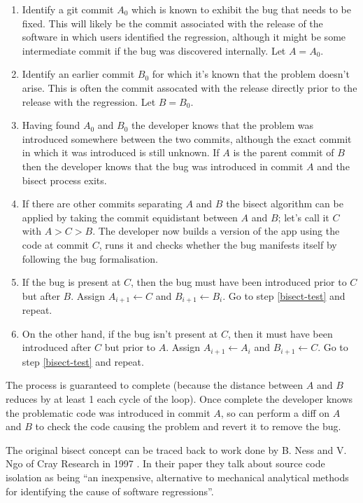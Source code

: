 \documentclass[10pt,journal,compsoc]{IEEEtran}
\begin{document}
\begin{enumerate}
\item \label{bisect-min} Identify a git commit $A_0$ which is known to exhibit the bug that needs to be fixed. This will likely be the commit associated with the release of the software in which users identified the regression, although it might be some intermediate commit if the bug was discovered internally. Let $A = A_0$.
\item \label{bisect-max} Identify an earlier commit $B_0$ for which it's known that the problem doesn't arise. This is often the commit assocated with the release directly prior to the release with the regression. Let $B = B_0$.
\item \label{bisect-test} Having found $A_0$ and $B_0$ the developer knows that the problem was introduced somewhere between the two commits, although the exact commit in which it was introduced is still unknown. If $A$ is the parent commit of $B$ then the developer knows that the bug was introduced in commit $A$ and the bisect process exits.
\item If there are other commits separating $A$ and $B$ the bisect algorithm can be applied by taking the commit equidistant between $A$ and $B$; let's call it $C$ with $A > C > B$. The developer now builds a version of the app using the code at commit $C$, runs it and checks whether the bug manifests itself by following the bug formalisation.
\item If the bug is present at $C$, then the bug must have been introduced prior to $C$ but after $B$. Assign $A_{i + 1} \leftarrow C$ and $B_{i + 1} \leftarrow B_i$. Go to step \ref{bisect-test} and repeat.
\item On the other hand, if the bug isn't present at $C$, then it must have been introduced after $C$ but prior to $A$. Assign $A_{i + 1} \leftarrow A_i$ and $B_{i + 1} \leftarrow C$. Go to step \ref{bisect-test} and repeat.
\end{enumerate}

The process is guaranteed to complete (because the distance between $A$ and $B$ reduces by at least 1 each cycle of the loop). Once complete the developer knows the problematic code was introduced in commit $A$, so can perform a diff on $A$ and $B$ to check the code causing the problem and revert it to remove the bug.

The original {\code bisect} concept can be traced back to work done by B. Ness and V. Ngo of Cray Research in 1997 \cite{ness1997}. In their paper they talk about source code isolation as being ``an inexpensive, alternative to mechanical analytical methods for identifying the cause of software regressions''.
\end{document}
